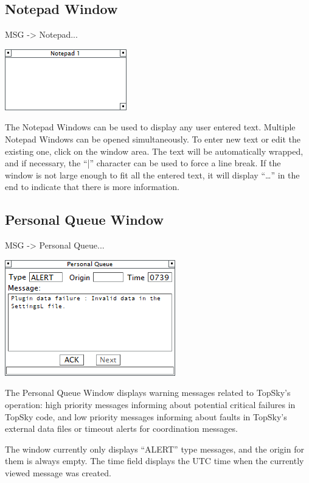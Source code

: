 \documentclass[11pt,a4paper]{memoir}
\begin{document}
\subsection{Notepad Window}
\label{win:note}

\textit{} MSG -> Notepad...

\includegraphics{img/note.png}

The Notepad Windows can be used to display any user entered text. Multiple Notepad Windows can be opened simultaneously. To enter new text or edit the existing one, click on the window area. The text will be automatically wrapped, and if necessary, the “|” character can be used to force a line break. If the window is not large enough to fit all the entered text, it will display “…” in the end to indicate that there is more information.

\subsection{Personal Queue Window}
\label{win:pqw}

\textit{} MSG -> Personal Queue...

\includegraphics{img/pq.png}

The Personal Queue Window displays warning messages related to TopSky’s operation: high priority messages informing about potential critical failures in TopSky code, and low priority messages informing about faults in TopSky’s external data files or timeout alerts for coordination messages.

The window currently only displays “ALERT” type messages, and the origin for them is always empty. The time field displays the UTC time when the currently viewed message was created.
\end{document}
